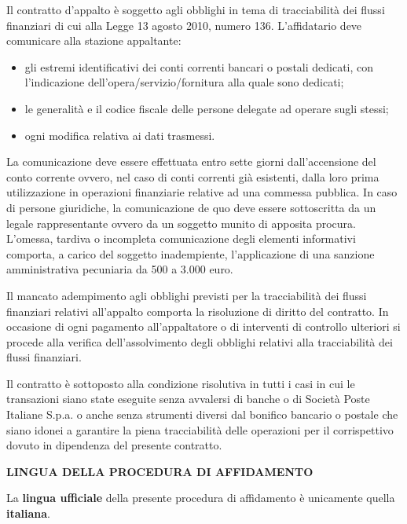 Il contratto d'appalto è soggetto agli obblighi in tema di
tracciabilità dei flussi finanziari di cui alla Legge 13 agosto 2010,
numero 136. L'affidatario deve comunicare alla stazione appaltante:

\begin{itemize}

\item gli estremi identificativi dei conti correnti bancari o postali
dedicati, con l'indicazione dell'opera/servizio/fornitura alla quale
sono dedicati;

\item le generalità e il codice fiscale delle persone delegate ad
operare sugli stessi;

\item ogni modifica relativa ai dati trasmessi. 
\end{itemize}

La comunicazione deve essere effettuata entro sette giorni dall'accensione
del conto corrente ovvero, nel caso di conti correnti già esistenti,
dalla loro prima utilizzazione in operazioni finanziarie relative ad
una commessa pubblica. In caso di persone giuridiche, la comunicazione
de quo deve essere sottoscritta da un legale rappresentante ovvero da
un soggetto munito di apposita procura. L'omessa, tardiva o incompleta
comunicazione degli elementi informativi comporta, a carico del soggetto
inadempiente, l'applicazione di una sanzione amministrativa pecuniaria
da 500 a 3.000 euro.

Il mancato adempimento agli obblighi previsti per la tracciabilità
dei flussi finanziari relativi all'appalto comporta la risoluzione di
diritto del contratto. In occasione di ogni pagamento all'appaltatore
o di interventi di controllo ulteriori si procede alla verifica
dell'assolvimento degli obblighi relativi alla tracciabilità dei
flussi finanziari.

Il contratto è sottoposto alla condizione risolutiva in tutti i casi
in cui le transazioni siano state eseguite senza avvalersi di banche
o di Società Poste Italiane S.p.a. o anche senza strumenti diversi
dal bonifico bancario o postale che siano idonei a garantire la piena
tracciabilità delle operazioni per il corrispettivo dovuto in dipendenza
del presente contratto.

\textbf{LINGUA DELLA PROCEDURA DI AFFIDAMENTO}

La \textbf{lingua ufficiale} della presente procedura di affidamento è unicamente quella \textbf{italiana}. 

